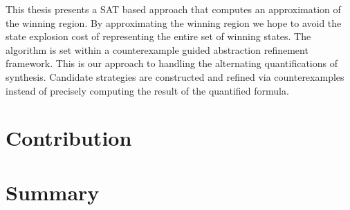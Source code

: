 This thesis presents a SAT based approach that computes an approximation of the winning region. By approximating the winning region we hope to avoid the state explosion cost of representing the entire set of winning states. The algorithm is set within a counterexample guided abstraction refinement framework. This is our approach to handling the alternating quantifications of synthesis. Candidate strategies are constructed and refined via counterexamples instead of precisely computing the result of the quantified formula.

\section{Contribution}


\section{Summary}






